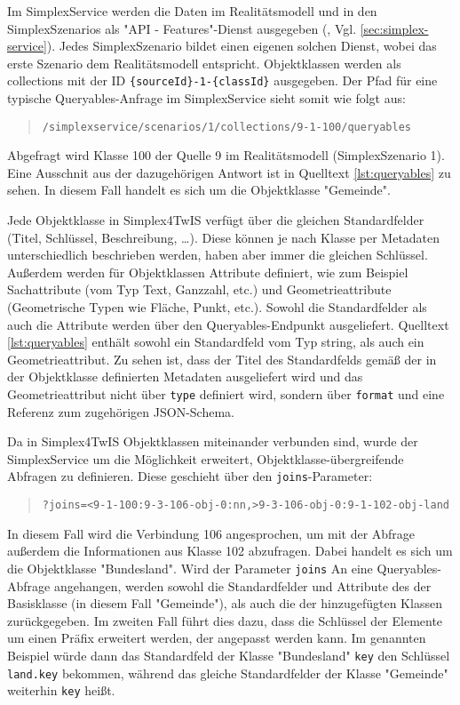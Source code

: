 

Im SimplexService werden die Daten im Realitätsmodell und in den SimplexSzenarios als "API - Features"-Dienst ausgegeben (\textcite{grossmannEnvVisioService2022}, Vgl. \ref{sec:simplex-service}). Jedes SimplexSzenario bildet einen eigenen solchen Dienst, wobei das erste Szenario dem Realitätsmodell entspricht. Objektklassen werden als collections mit der ID \texttt{\{sourceId\}-1-\{classId\}} ausgegeben. Der Pfad für eine typische Queryables-Anfrage im SimplexService sieht somit wie folgt aus:
\begin{quote}
  \texttt{/simplexservice/scenarios/1/collections/9-1-100/queryables}
\end{quote}
Abgefragt wird Klasse 100 der Quelle 9 im Realitätsmodell (SimplexSzenario 1). Eine Ausschnit aus der dazugehörigen Antwort ist in Quelltext \ref{lst:queryables} zu sehen. In diesem Fall handelt es sich um die Objektklasse "Gemeinde".

Jede Objektklasse in Simplex4TwIS verfügt über die gleichen Standardfelder (Titel, Schlüssel, Beschreibung, \dots). Diese können je nach Klasse per Metadaten unterschiedlich beschrieben werden, haben aber immer die gleichen Schlüssel. Außerdem werden für Objektklassen Attribute definiert, wie zum Beispiel Sachattribute (vom Typ Text, Ganzzahl, etc.) und Geometrieattribute (Geometrische Typen wie Fläche, Punkt, etc.). Sowohl die Standardfelder als auch die Attribute werden über den Queryables-Endpunkt ausgeliefert. Quelltext \ref{lst:queryables} enthält sowohl ein Standardfeld vom Typ string, als auch ein Geometrieattribut. Zu sehen ist, dass der Titel des Standardfelds gemäß der in der Objektklasse definierten Metadaten ausgeliefert wird und das Geometrieattribut nicht über \texttt{type}  definiert wird, sondern über \texttt{format} und eine Referenz zum zugehörigen \ac{JSON}-Schema.

Da in Simplex4TwIS Objektklassen miteinander verbunden sind, wurde der SimplexService um die Möglichkeit erweitert, Objektklasse-übergreifende Abfragen zu definieren. Diese geschieht über den \texttt{joins}-Parameter:
\begin{quote}
  \texttt{?joins=<9-1-100:9-3-106-obj-0:nn,>9-3-106-obj-0:9-1-102-obj-land}
\end{quote}
In diesem Fall wird die Verbindung 106 angesprochen, um mit der Abfrage außerdem die Informationen aus Klasse 102 abzufragen. Dabei handelt es sich um die Objektklasse "Bundesland". Wird der Parameter \texttt{joins} An eine Queryables-Abfrage angehangen, werden sowohl die Standardfelder und Attribute des der Basisklasse (in diesem Fall "Gemeinde"), als auch die der hinzugefügten Klassen zurückgegeben. Im zweiten Fall führt dies dazu, dass die Schlüssel der Elemente um einen Präfix erweitert werden, der angepasst werden kann. Im genannten Beispiel würde dann das Standardfeld der Klasse "Bundesland" \texttt{key} den Schlüssel \texttt{land.key} bekommen, während das gleiche Standardfelder der Klasse "Gemeinde" weiterhin \texttt{key} heißt.
